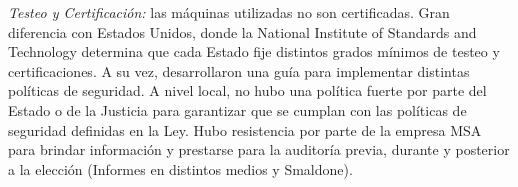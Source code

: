 \textit{Testeo y Certificación:} las máquinas utilizadas no son certificadas. Gran diferencia con Estados Unidos, donde la National Institute of Standards and Technology determina que cada Estado fije distintos grados mínimos de testeo y certificaciones. A su vez, desarrollaron una guía para implementar distintas políticas de seguridad. A nivel local, no hubo una política fuerte por parte del Estado o de la Justicia para garantizar que se cumplan con las políticas de seguridad definidas en la Ley. Hubo resistencia por parte de la empresa MSA para brindar información y prestarse para la auditoría previa, durante y posterior a la elección (Informes en distintos medios y Smaldone).
